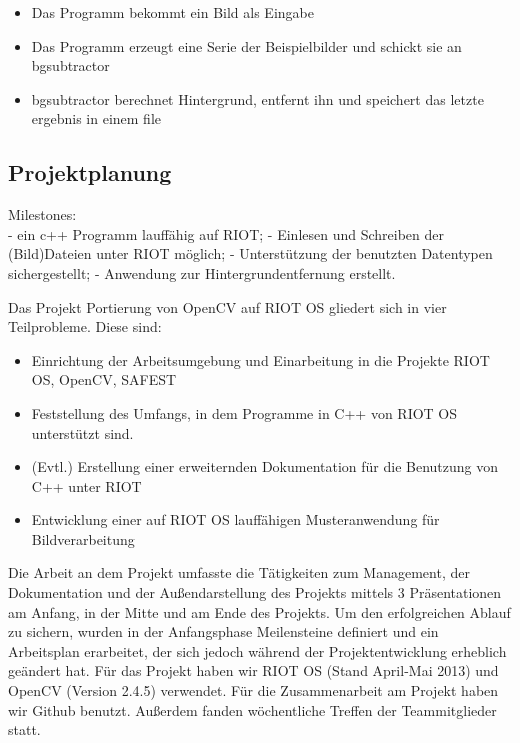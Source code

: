 \documentclass[10pt,a4paper]{article}
\begin{document}
\begin{itemize}
\item Das Programm bekommt ein Bild als Eingabe
\item Das Programm erzeugt eine Serie der Beispielbilder und schickt sie an bgsubtractor
\item bgsubtractor berechnet Hintergrund, entfernt ihn und speichert das letzte ergebnis in einem file
\end{itemize}

\subsection{Projektplanung}

Milestones: \\
- ein c++ Programm lauffähig auf RIOT; \newline
- Einlesen und Schreiben der (Bild)Dateien unter RIOT möglich; \newline
- Unterstützung der benutzten Datentypen sichergestellt; \newline
- Anwendung zur Hintergrundentfernung erstellt. \newline


Das Projekt Portierung von OpenCV auf RIOT OS gliedert sich in vier Teilprobleme. Diese sind:
\begin{itemize}
\item Einrichtung der Arbeitsumgebung und Einarbeitung in die Projekte RIOT OS, OpenCV, SAFEST
\item Feststellung des Umfangs, in dem Programme in C++ von RIOT OS unterstützt sind.
\item (Evtl.) Erstellung einer erweiternden Dokumentation für die Benutzung von C++ unter RIOT
\item Entwicklung einer auf RIOT OS lauffähigen Musteranwendung für Bildverarbeitung
\end{itemize}

Die Arbeit an dem Projekt umfasste die Tätigkeiten zum Management, der Dokumentation und der Außendarstellung des Projekts mittels 3 Präsentationen am Anfang, in der Mitte und am Ende des Projekts. Um den erfolgreichen Ablauf zu sichern, wurden in der Anfangsphase Meilensteine definiert und ein Arbeitsplan erarbeitet, der sich jedoch während der Projektentwicklung erheblich geändert hat. Für das Projekt haben wir RIOT OS (Stand April-Mai 2013) und OpenCV (Version 2.4.5) verwendet. Für die Zusammenarbeit am Projekt haben wir Github benutzt. Außerdem fanden wöchentliche Treffen der Teammitglieder statt. \\
\end{document}
